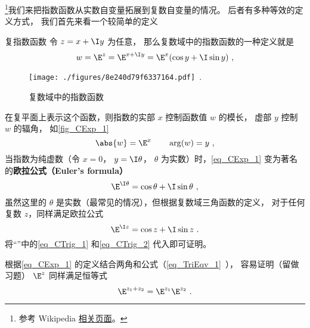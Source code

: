 
\begin{issues}
\issueTODO
\end{issues}



\footnote{参考 Wikipedia \href{https://en.wikipedia.org/wiki/Euler's_formula}{相关页面}。}我们来把指数函数从实数自变量拓展到复数自变量的情况。 后者有多种等效的定义方式， 我们首先来看一个较简单的定义

\begin{definition}{复指数函数}
令 $z = x + \I y$ 为任意， 那么复数域中的指数函数的一种定义就是
\begin{equation}\label{eq_CExp_1}
w = \E^z = \E^{x + \I y} = \E^x(\cos y + \I\sin y)~,
\end{equation}
\end{definition}

\begin{figure}[ht]
\centering
\texttt{[image: ./figures/8e240d79f6337164.pdf]}~.
\caption{复数域中的指数函数} \label{fig_CExp_1}
\end{figure}

在复平面上表示这个函数，则指数的实部 $x$ 控制函数值 $w$ 的模长， 虚部 $y$ 控制 $w$ 的辐角， 如\autoref{fig_CExp_1}
 \begin{equation}
\abs{w} = \E^x \qquad \arg(w) = y~,
\end{equation}
当指数为纯虚数（令 $x = 0$， $y = \I\theta$， $\theta$ 为实数）时，\autoref{eq_CExp_1} 变为著名的\textbf{欧拉公式（Euler's formula）}
\begin{equation}\label{eq_CExp_2}
\E^{\I \theta} = \cos \theta + \I\sin \theta~,
\end{equation}
虽然这里的 $\theta$ 是实数（最常见的情况），但根据复数域三角函数的定义， 对于任何复数 $z$，同样满足欧拉公式
\begin{equation}
\E^{\I z} = \cos z + \I\sin z~.
\end{equation}
将“”中的\autoref{eq_CTrig_1} 和\autoref{eq_CTrig_2} 代入即可证明。

根据\autoref{eq_CExp_1} 的定义结合两角和公式（\autoref{eq_TriEqv_1}~）， 容易证明（留做习题） $\E^z$ 同样满足恒等式
\begin{equation}
\E^{z_1 + z_2} = \E^{z_1}\E^{z_2}~.
\end{equation}


